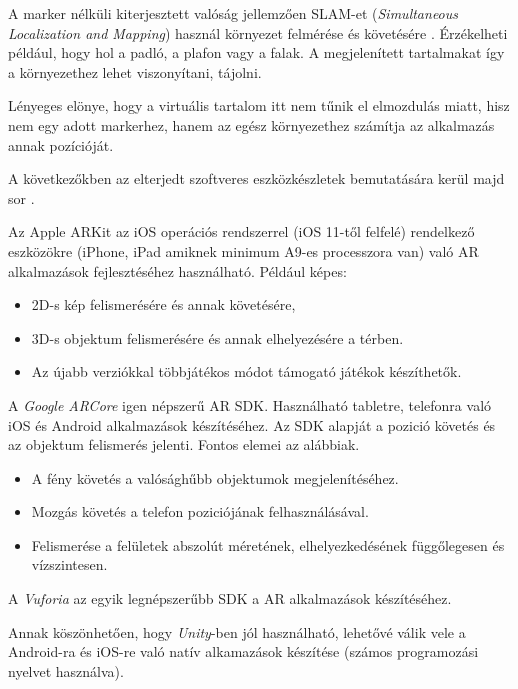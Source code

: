 
A marker nélküli kiterjesztett valóság jellemzően SLAM-et (\textit{Simultaneous Localization and Mapping}) használ környezet felmérése és követésére \cite{stachniss2016simultaneous}.
Érzékelheti például, hogy hol a padló, a plafon vagy a falak.
A megjelenített tartalmakat így a környezethez lehet viszonyítani, tájolni.

Lényeges elönye, hogy a virtuális tartalom itt nem tűnik el elmozdulás miatt, hisz nem egy adott markerhez,
hanem az egész környezethez számítja az alkalmazás annak pozícióját.


A következőkben az elterjedt szoftveres eszközkészletek bemutatására kerül majd sor \cite{hanafi2019comparative}.


Az Apple ARKit az iOS operációs rendszerrel (iOS 11-től felfelé) rendelkező eszközökre (iPhone, iPad amiknek minimum A9-es processzora van) való AR alkalmazások fejlesztéséhez használható. 
Például képes: 
\begin{itemize}
\item 2D-s kép felismerésére és annak követésére,
\item 3D-s objektum felismerésére és annak elhelyezésére a térben.
\item Az újabb verziókkal többjátékos módot támogató játékok készíthetők. 
\end{itemize}


A \textit{Google ARCore} igen népszerű AR SDK. Használható tabletre, telefonra való iOS és Android alkalmazások készítéséhez. Az SDK alapját a pozició követés és az objektum felismerés jelenti.
Fontos elemei az alábbiak.
\begin{itemize}
\item A fény követés a valósághűbb objektumok megjelenítéséhez.
\item Mozgás követés a telefon poziciójának felhasználásával.
\item Felismerése a felületek abszolút méretének, elhelyezkedésének függőlegesen és vízszintesen.
\end{itemize}


A \textit{Vuforia} az egyik legnépszerűbb SDK a AR alkalmazások készítéséhez.

Annak köszönhetően, hogy \textit{Unity}-ben jól használható, lehetővé válik vele a Android-ra és iOS-re való natív alkamazások készítése (számos programozási nyelvet használva).

